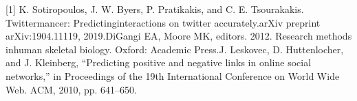 \documentclass[12pt,oneside]{book}
\begin{document}
% 

%





\tableofcontents
\listoffigures




\mainmatter





%





 
[1] K. Sotiropoulos, J. W. Byers, P. Pratikakis, and C. E. Tsourakakis. Twittermancer: Predictinginteractions on twitter accurately.arXiv preprint arXiv:1904.11119, 2019.\newline
[2] DiGangi EA, Moore MK, editors. 2012. Research methods inhuman skeletal biology. Oxford: Academic Press.\newline
[3] J. Leskovec, D. Huttenlocher, and J. Kleinberg, “Predicting positive and negative links in online social networks,” in Proceedings of the 19th International Conference on World Wide Web. ACM, 2010, pp. 641–650.

\begin{appendices}

%
\end{appendices}
\end{document}
